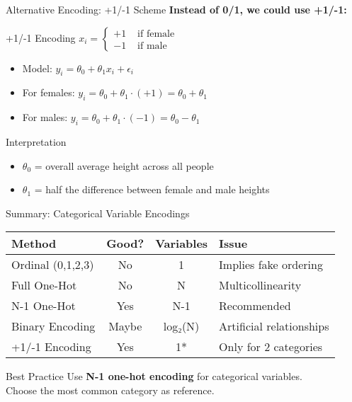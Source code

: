 \documentclass{beamer}
\begin{document}
    \begin{frame}{Alternative Encoding: +1/-1 Scheme}
    \textbf{Instead of 0/1, we could use +1/-1:}
    
    \begin{examplebox}{+1/-1 Encoding}
    \(x_{i}=\left\{\begin{array}{ll}{+1} & {\text { if female }} \\ {-1} & {\text { if male }}\end{array}\right.\)
    \end{examplebox}
    
    \pause
    \begin{itemize}[<+->]
        \item Model: \(y_{i}=\theta_{0}+\theta_{1} x_{i}+\epsilon_{i}\)
        \item For females: \(y_{i}=\theta_{0}+\theta_{1} \cdot (+1) = \theta_{0}+\theta_{1}\)
        \item For males: \(y_{i}=\theta_{0}+\theta_{1} \cdot (-1) = \theta_{0}-\theta_{1}\)
    \end{itemize}
    
    \pause
    \begin{keypointsbox}{Interpretation}
    \begin{itemize}
        \item $\theta_{0}$ = overall average height across all people
        \item $\theta_{1}$ = half the difference between female and male heights
    \end{itemize}
    \end{keypointsbox}
\end{frame}

\begin{frame}{Summary: Categorical Variable Encodings}
\begin{center}
\begin{tabular}{|l|c|c|l|}
\hline
\textbf{Method} & \textbf{Good?} & \textbf{Variables} & \textbf{Issue} \\
\hline
\hline
Ordinal (0,1,2,3) & No & 1 & Implies fake ordering \\
\hline
Full One-Hot & No & N & Multicollinearity \\
\hline
N-1 One-Hot & Yes & N-1 & Recommended \\
\hline
Binary Encoding & Maybe & log₂(N) & Artificial relationships \\
\hline
+1/-1 Encoding & Yes & 1* & Only for 2 categories \\
\hline
\end{tabular}
\end{center}

\pause
\begin{definitionbox}{Best Practice}
Use \textbf{N-1 one-hot encoding} for categorical variables.
\\ Choose the most common category as reference.
\end{definitionbox}
\end{frame}
\end{document}
